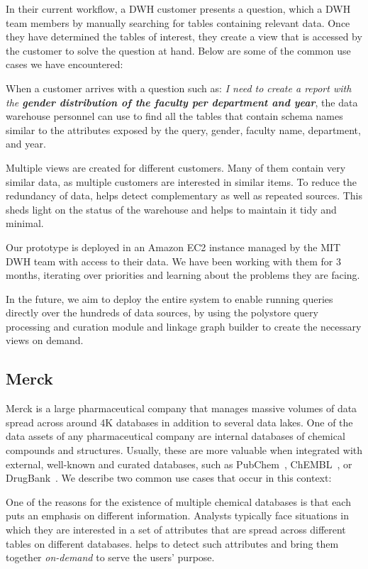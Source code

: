 In their current workflow, a
DWH customer presents a question, which a DWH team
members by manually searching for tables containing relevant data. Once they have determined
the tables of interest, they create a view that is accessed by the customer to
solve the question at hand. Below are some of the common use cases we have
encountered:

 When a customer arrives with a question such as:
\emph{I need to create a report with the \textbf{gender distribution of the
faculty per department and year}}, the data warehouse personnel can use \dcv to
find all the tables that contain schema names similar to the attributes exposed
by the query, \eg gender, faculty name, department, and year.

 Multiple views are created for different customers.
Many of them contain very similar data, as multiple customers are
interested in similar items. To reduce the redundancy of data, \dcv helps
detect complementary as well as repeated sources. This sheds light on the status
of the warehouse and helps to maintain it tidy and minimal.

Our prototype is deployed in an Amazon EC2 instance managed by the MIT DWH team
with access to their data. We have been working with them for 3 months,
iterating over priorities and learning about the problems they are facing.

In the future, we aim to deploy the entire \dcv system to enable running queries
directly over the hundreds of data sources, by using the polystore query
processing and curation module and linkage graph builder to create the necessary
views on demand. 

\subsection{Merck}

Merck is a large pharmaceutical company that manages massive volumes of data spread
across around 4K databases in addition to several data lakes. 
One of the data assets of any pharmaceutical company are internal databases of
chemical compounds and structures. Usually, these are more valuable when
integrated with external, well-known and curated databases, such as
PubChem~\cite{pubchem}, ChEMBL~\cite{ChEMBL}, or DrugBank~\cite{DrugBank}. We
describe two common use cases that occur in this context:

 One of the reasons for the existence of multiple chemical
databases is that each puts an emphasis on different information. Analysts
typically face situations in which they are interested in a set of attributes
that are spread across different tables on different databases. \dcv helps to
detect such attributes and bring them together \emph{on-demand}  to serve the
users' purpose.

